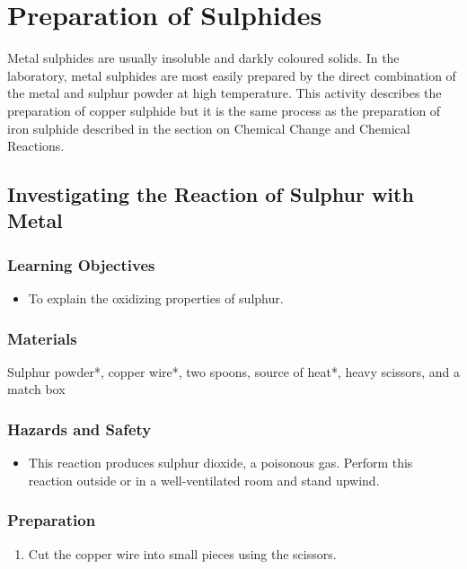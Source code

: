 \section{Preparation of Sulphides}

Metal sulphides are usually insoluble and darkly coloured solids. In the laboratory, metal sulphides are most easily prepared by the direct combination of the metal and sulphur powder at high temperature. This activity describes the preparation of copper sulphide but it is the same process as the preparation of iron sulphide described in the section on Chemical Change and Chemical Reactions.

\subsection{Investigating the Reaction of Sulphur with Metal}

\subsubsection*{Learning Objectives}
\begin{itemize}
\item{To explain the oxidizing properties of sulphur.}
\end{itemize}

\subsubsection*{Materials}
Sulphur powder*, copper wire*, two spoons, source of heat*, heavy scissors, and a match box

\subsubsection*{Hazards and Safety}
\begin{itemize}
\item{This reaction produces sulphur dioxide, a poisonous gas. Perform this reaction outside or in a well-ventilated room and stand upwind.}
\end{itemize}

\subsubsection*{Preparation}
\begin{enumerate}
\item{Cut the copper wire into small pieces using the scissors.}
\end{enumerate}

